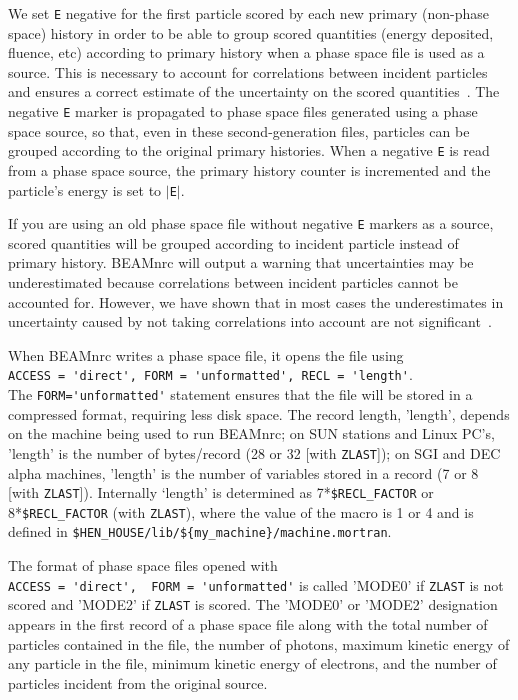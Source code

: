 \documentclass[12pt,twoside]{article}
\begin{document}
We set {\tt E} negative for the first particle scored by each new
primary (non-phase space) history in order to be able to group scored
quantities (energy deposited, fluence, etc) according to primary history
when a phase space file is used as a source.  This is necessary to
account for correlations between incident particles and ensures a
correct estimate of the uncertainty on the scored quantities~\cite{Wa02a}.
The negative {\tt E} marker is propagated to phase space files generated
using a phase space source, so that, even in these second-generation
files, particles can be grouped according to the original primary
histories.  When a negative {\tt E} is read from a phase space source,
the primary history counter is incremented and the particle's energy
is set to $|${\tt E}$|$.

If you are using an old phase space file without negative
{\tt E} markers as a source, scored quantities will be grouped according
to incident particle instead of primary history.  BEAMnrc will output
a warning that uncertainties may be underestimated because correlations
between incident particles cannot be accounted for.  However, we have
shown that in most cases the underestimates in uncertainty caused by
not taking correlations into account are
not significant~\cite{Wa02a}.

When BEAMnrc writes a phase space file, it opens the file using\\
\verb+ACCESS = 'direct', FORM = 'unformatted', RECL = 'length'+.\\
The \verb+FORM='unformatted'+ statement ensures that
the file will be stored in a
compressed format, requiring less disk space.  The record length,
'length', depends on the machine being used to run BEAMnrc; on SUN
stations and Linux PC's, 'length' is the number of bytes/record
(28 or 32 [with {\tt ZLAST}]);
on SGI and DEC alpha
machines, 'length' is the number of variables stored in a
record (7 or 8 [with {\tt ZLAST}]).   Internally `length' is determined as
7*\verb+$RECL_FACTOR+ or 8*\verb+$RECL_FACTOR+ (with {\tt ZLAST}),
where the value of the macro is 1 or 4 and is defined in
\verb+$HEN_HOUSE/lib/${my_machine}/machine.mortran+.

The format of phase space files opened with \\
\verb+ACCESS = 'direct',  FORM = 'unformatted'+ is called
'MODE0' if
\verb+ZLAST+ is not
scored and 'MODE2' if
\verb+ZLAST+ is scored.  The 'MODE0' or 'MODE2'
designation appears in the first record of a phase space file along
with the total number of particles contained in the file, the number
of photons, maximum kinetic energy of any particle in the file,
minimum kinetic energy of electrons, and the number of particles incident
from the original source.
\end{document}

